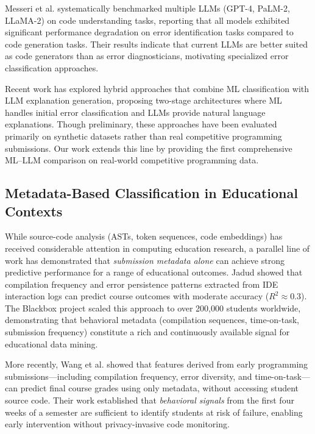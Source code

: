 \documentclass[10pt,a4paper]{article}
\begin{document}
Messeri et al. \cite{prather2024code} systematically benchmarked multiple
LLMs (GPT-4, PaLM-2, LLaMA-2) on code understanding tasks, reporting that
all models exhibited significant performance degradation on error
identification tasks compared to code generation tasks. Their results indicate
that current LLMs are better suited as code generators than as error
diagnosticians, motivating specialized error classification
approaches.

Recent work has explored hybrid approaches that combine ML classification
with LLM explanation generation, proposing two-stage architectures where
ML handles initial error classification and LLMs provide natural language
explanations. Though preliminary, these approaches have been evaluated primarily
on synthetic datasets rather than real competitive programming submissions.
Our work extends this line by providing the first comprehensive ML--LLM
comparison on real-world competitive programming data.

\subsection{Metadata-Based Classification in Educational Contexts}

While source-code analysis (ASTs, token sequences, code embeddings) has
received considerable attention in computing education research, a parallel
line of work has demonstrated that \textit{submission metadata alone} can
achieve strong predictive performance for a range of educational outcomes.
Jadud \cite{jadud2006methods} showed that compilation frequency and
error persistence patterns extracted from IDE interaction logs can predict
course outcomes with moderate accuracy ($R^2 \approx 0.3$). The Blackbox
project \cite{bey2022analyzing} scaled this approach to over 200,000
students worldwide, demonstrating that behavioral metadata (compilation
sequences, time-on-task, submission frequency) constitute a rich and
continuously available signal for educational data mining.

More recently, Wang et al. \cite{wang2017learning} showed that features
derived from early programming submissions—including compilation frequency,
error diversity, and time-on-task—can predict final course grades using
only metadata, without accessing student source code. Their work established
that \textit{behavioral signals} from the first four weeks of a semester
are sufficient to identify students at risk of failure, enabling early
intervention without privacy-invasive code monitoring.
\end{document}
